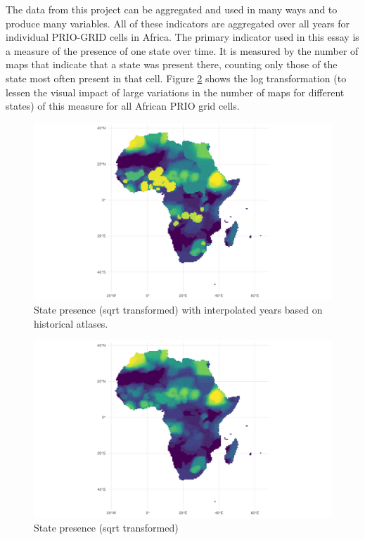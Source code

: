 \documentclass[12pt]{article}
\begin{document}

The data from this project can be aggregated and used in many ways and to
produce many variables. All of these indicators are aggregated over all years
for individual PRIO-GRID cells in Africa. The primary indicator used in this
essay is a measure of the presence of one state over time. It is measured by the
number of maps that indicate that a state was present there, counting only those
of the state most often present in that cell. Figure \ref{Sp} shows the log
transformation (to lessen the visual impact of large variations in the number of
maps for different states) of this measure for all African PRIO grid cells.


\begin{figure}[htpb]
	\centering
	\includegraphics[width=\linewidth]{../R/Output/sp_os_i_sum_any_plot.pdf}
	\caption{State presence (sqrt transformed) with interpolated years based
	on historical atlases.}
	\label{Sp_i}
\end{figure}

\begin{figure}[htpb]
	\centering
	\includegraphics[width=\linewidth]{../R/Output/sp_os_sum_any_plot.pdf}
	\caption{State presence (sqrt transformed)}
	\label{Sp}
\end{figure}
\end{document}

